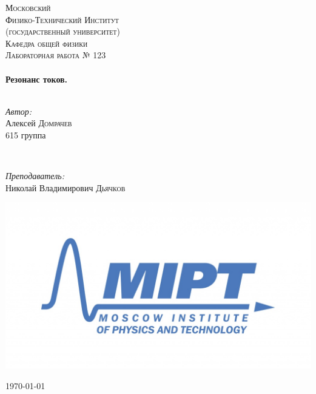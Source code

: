 \begin{titlepage}
\center %
 

\textsc{\LARGE Московский\\[-0.2cm]Физико-Технический Институт\\[0.1cm]\large (государственный университет)}\\[1.5cm] %
\textsc{\Large Кафедра общей физики}\\[0.1cm] %
\textsc{\large Лабораторная работа № 123}\\[0.5cm] %


\HRule
\\[0.6cm]
{ \huge \bfseries Резонанс токов.}
\\[0.3cm] %
\HRule
\\[1.5cm]


 

	\begin{minipage}{0.4\textwidth}
	\begin{flushleft} \large
		\emph{Автор:}\\
		Алексей \textsc{Домрачев} \\
		615 группа
	\end{flushleft}
\end{minipage}
~
\begin{minipage}{0.4\textwidth}
	\begin{flushright} \large
		\emph{Преподаватель:} \\
		Николай Владимирович \textsc{Дьячков} %
	\end{flushright}
\end{minipage}

\begin{bottompar}
	\begin{center}
		\includegraphics[width = 80 mm]{logo.jpg}
	\end{center}
	{\large \today}
	
\end{bottompar}
\vfill %
\end{titlepage}